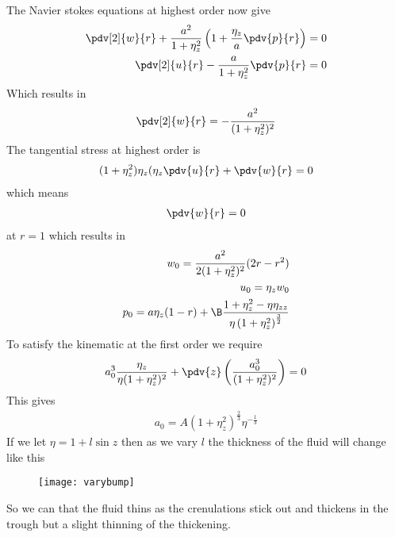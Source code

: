 \documentclass[12pt]{article}
\begin{document}
The Navier stokes equations at highest order now give
\begin{align}
\pdv[2]{w}{r}+\frac{a^2}{1+\eta_z^2}\left(1 +\frac{\eta_z}{a}\pdv{p}{r}\right)=0\\
\pdv[2]{u}{r}-\frac{a}{1+\eta_z^2}\pdv{p}{r}=0
\end{align}
Which results in 
\begin{align}
\pdv[2]{w}{r} = -\frac{a^2}{(1+\eta_z^2)^2}
\end{align}
The tangential stress at highest order is 
\begin{align}
(1+\eta_z^2)\eta_z(\eta_z\pdv{u}{r}+\pdv{w}{r} =0
\end{align}
which means 
\begin{align}
\pdv{w}{r} =0
\end{align}
at $r = 1$
which results in 
\begin{align}
w_0= \frac{a^2}{2(1+\eta_z^2)^2}(2r- r^2)\\
u_0 = \eta_z w_0\\
p_0 = a\eta_z(1-r)+\B\frac{1+\eta_z^2- \eta\eta_{zz}}{\eta\left(1+\eta_z^2\right)^{\frac{3}{2}}}
\end{align}
To satisfy the kinematic at the first order we require
\begin{align}
a_0^3\frac{\eta_z}{\eta(1+\eta_z^2)^2}+\pdv{z}\left(\frac{a_0^3}{(1+\eta_z^2)^2}\right)=0
\end{align}
This gives
\begin{align}
a_0=A (1+\eta_z^2)^{\frac{2}{3}}\eta^{-\frac{1}{3}}
\end{align}
If we let $\eta = 1 +l\sin z$ then as we vary $l$ the thickness of the fluid will change like this
\begin{figure}[H]
	\texttt{[image: varybump]}
\end{figure}
So we can that the fluid thins as the crenulations stick out and thickens in the trough but a slight thinning of the thickening.
\end{document}
